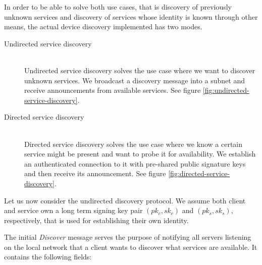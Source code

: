 In order to be able to solve both use cases, that is discovery of previously unknown services and discovery of services whose identity is known through other means, the actual device discovery implemented has two modes.
\begin{description}
    \item[Undirected service discovery]\hfill\\
        Undirected service discovery solves the use case where we want to discover unknown services.
        We broadcast a discovery  message into a subnet and receive announcements from available services.
        See figure \ref{fig:undirected-service-discovery}.
    \item[Directed service discovery]\hfill\\
        Directed service discovery solves the use case where we know a certain service might be present and want to probe it for availability.
        We establish an authenticated connection to it with pre-shared public signature keys and then receive its announcement.
        See figure \ref{fig:directed-service-discovery}.
\end{description}

Let us now consider the undirected discovery protocol.
We assume both client and service own a long term signing key pair $(pk_c, sk_c)$ and $(pk_s, sk_s)$, respectively, that is used for establishing their own identity.

The initial \emph{Discover} message serves the purpose of notifying all servers listening on the local network that a client wants to discover what services are available.
It contains the following fields:

